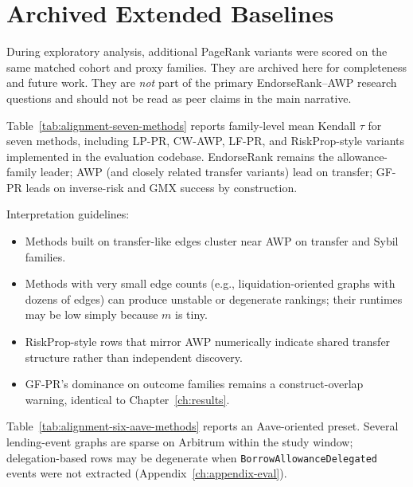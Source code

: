 \section{Archived Extended Baselines}
\label{ch:appendix-archive}

During exploratory analysis, additional PageRank variants were scored on the same matched cohort and proxy families. They are archived here for completeness and future work. They are \emph{not} part of the primary EndorseRank--AWP research questions and should not be read as peer claims in the main narrative.


Table~\ref{tab:alignment-seven-methods} reports family-level mean Kendall $\tau$ for seven methods, including LP-PR, CW-AWP, LF-PR, and RiskProp-style variants implemented in the evaluation codebase. EndorseRank remains the allowance-family leader; AWP (and closely related transfer variants) lead on transfer; GF-PR leads on inverse-risk and GMX success by construction.



Interpretation guidelines:

\begin{itemize}
\item Methods built on transfer-like edges cluster near AWP on transfer and Sybil families.
\item Methods with very small edge counts (e.g., liquidation-oriented graphs with dozens of edges) can produce unstable or degenerate rankings; their runtimes may be low simply because $m$ is tiny.
\item RiskProp-style rows that mirror AWP numerically indicate shared transfer structure rather than independent discovery.
\item GF-PR's dominance on outcome families remains a construct-overlap warning, identical to Chapter~\ref{ch:results}.
\end{itemize}


Table~\ref{tab:alignment-six-aave-methods} reports an Aave-oriented preset. Several lending-event graphs are sparse on Arbitrum within the study window; delegation-based rows may be degenerate when \texttt{BorrowAllowanceDelegated} events were not extracted (Appendix~\ref{ch:appendix-eval}).


